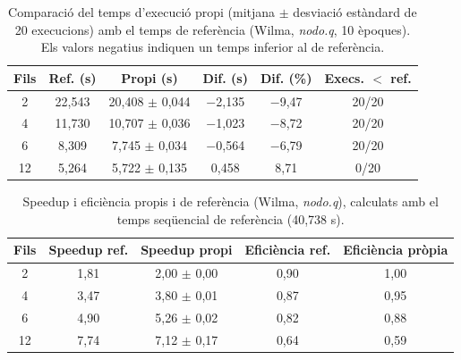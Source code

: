 \begin{table}[H]
\centering
\begin{tabular}{|c|c|c|c|c|c|}
\hline
\textbf{Fils} & \textbf{Ref. (s)} & \textbf{Propi (s)} & \textbf{Dif. (s)} & \textbf{Dif. (\%)} & \textbf{Execs. $<$ ref.} \\ \hline
2 & 22,543 & 20,408 $\pm$ 0,044 & $-$2,135 & $-$9,47 & 20/20 \\ \hline
4 & 11,730 & 10,707 $\pm$ 0,036 & $-$1,023 & $-$8,72 & 20/20 \\ \hline
6 & 8,309 & 7,745 $\pm$ 0,034 & $-$0,564 & $-$6,79 & 20/20 \\ \hline
12 & 5,264 & 5,722 $\pm$ 0,135 & 0,458 & 8,71 & 0/20 \\ \hline
\end{tabular}
\caption{Comparació del temps d'execució propi (mitjana $\pm$ desviació estàndard de 20 execucions) amb el temps de referència (Wilma, \textit{nodo.q}, 10 èpoques). Els valors negatius indiquen un temps inferior al de referència.}
\label{tab:comp_temps}
\end{table}

\begin{table}[H]
\centering
\begin{tabular}{|c|c|c|c|c|}
\hline
\textbf{Fils} & \textbf{Speedup ref.} & \textbf{Speedup propi} & \textbf{Eficiència ref.} & \textbf{Eficiència pròpia} \\ \hline
2 & 1,81 & 2,00 $\pm$ 0,00 & 0,90 & 1,00 \\ \hline
4 & 3,47 & 3,80 $\pm$ 0,01 & 0,87 & 0,95 \\ \hline
6 & 4,90 & 5,26 $\pm$ 0,02 & 0,82 & 0,88 \\ \hline
12 & 7,74 & 7,12 $\pm$ 0,17 & 0,64 & 0,59 \\ \hline
\end{tabular}
\caption{Speedup i eficiència propis i de referència (Wilma, \textit{nodo.q}), calculats amb el temps seqüencial de referència (40,738 s).}
\label{tab:comp_speedup}
\end{table}
